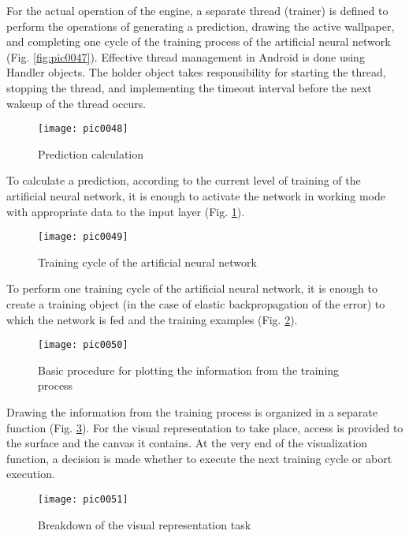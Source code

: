 For the actual operation of the engine, a separate thread (trainer) is defined to perform the operations of generating a prediction, drawing the active wallpaper, and completing one cycle of the training process of the artificial neural network (Fig. \ref {fig:pic0047}). Effective thread management in Android is done using Handler objects. The holder object takes responsibility for starting the thread, stopping the thread, and implementing the timeout interval before the next wakeup of the thread occurs.

\begin{figure}[h]
\centering
\texttt{[image: pic0048]}
\caption{Prediction calculation}
\label{fig:pic0048}
\end{figure}
\FloatBarrier

To calculate a prediction, according to the current level of training of the artificial neural network, it is enough to activate the network in working mode with appropriate data to the input layer (Fig. \ref{fig:pic0048}).

\begin{figure}[h]
\centering
\texttt{[image: pic0049]}
\caption{Training cycle of the artificial neural network}
\label{fig:pic0049}
\end{figure}
\FloatBarrier

To perform one training cycle of the artificial neural network, it is enough to create a training object (in the case of elastic backpropagation of the error) to which the network is fed and the training examples (Fig. \ref{fig:pic0049}).

\begin{figure}[h]
\centering
\texttt{[image: pic0050]}
\caption{Basic procedure for plotting the information from the training process}
\label{fig:pic0050}
\end{figure}
\FloatBarrier

Drawing the information from the training process is organized in a separate function (Fig. \ref{fig:pic0050}). For the visual representation to take place, access is provided to the surface and the canvas it contains. At the very end of the visualization function, a decision is made whether to execute the next training cycle or abort execution.

\begin{figure}[h]
\centering
\texttt{[image: pic0051]}
\caption{Breakdown of the visual representation task}
\label{fig:pic0051}
\end{figure}
\FloatBarrier

